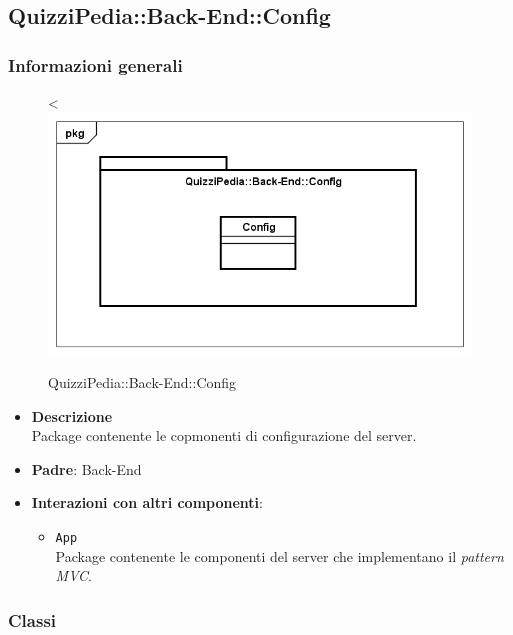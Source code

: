 \subsection{QuizziPedia::Back-End::Config}
\subsubsection{Informazioni generali}
\label{QuizziPedia::Back-End::Config}
\begin{figure}
	\centering<
	\includegraphics[scale=0.45]{UML/Package/QuizziPedia_Back-End_Config.png}
	\caption{QuizziPedia::Back-End::Config}
\end{figure}
	\begin{itemize}
		\item \textbf{Descrizione} \\
		Package contenente le copmonenti di configurazione del server.
		\item \textbf{Padre}: Back-End
		\item \textbf{Interazioni con altri componenti}:
			\begin{itemize}
				\item \texttt{App} \\
				Package contenente le componenti del server che implementano il \textit{pattern MVC}.
			\end{itemize}
	\end{itemize}
\subsubsection{Classi}
